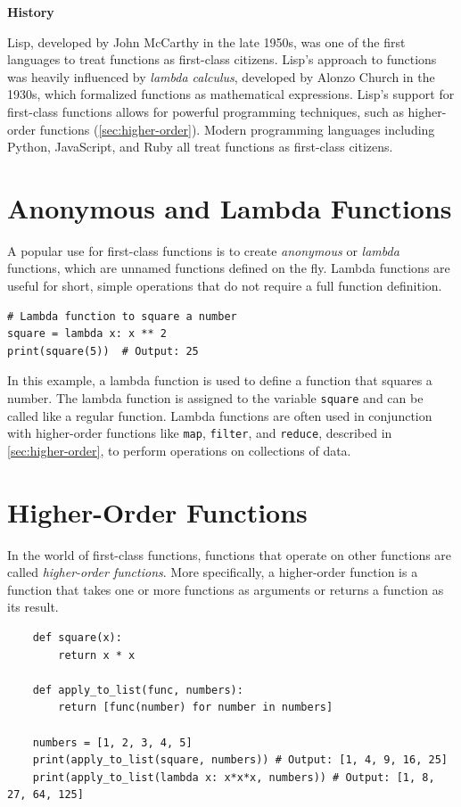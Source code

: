 \documentclass[oneside,11pt,dvipsnames]{book}
\newenvironment{historybox}[1][]{
  \small
  \begin{myhistorybox}
    {\small \textbf{#1}}
  }{
  \end{myhistorybox}
}
\newcommand{\code}[1]{\texttt{#1}}
\begin{document}
\begin{historybox}[History]
Lisp, developed by John McCarthy in the late 1950s, was one of the first languages to treat functions as first-class citizens. Lisp's approach to functions was heavily influenced by \emph{lambda calculus}, developed by Alonzo Church in the 1930s, which formalized functions as mathematical expressions. Lisp's support for first-class functions allows for powerful programming techniques, such as higher-order functions (\autoref{sec:higher-order}).  Modern programming languages including Python, JavaScript, and Ruby all treat functions as first-class citizens. 
\end{historybox}

\section{Anonymous and Lambda Functions}\label{sec:lambda}
A popular use for first-class functions is to create \emph{anonymous} or \emph{lambda} functions, which are unnamed functions defined on the fly. Lambda functions are useful for short, simple operations that do not require a full function definition. 
\begin{lstlisting}
# Lambda function to square a number
square = lambda x: x ** 2
print(square(5))  # Output: 25
\end{lstlisting}

In this example, a lambda function is used to define a function that squares a number. The lambda function is assigned to the variable \code{square} and can be called like a regular function.
Lambda functions are often used in conjunction with higher-order functions like \code{map}, \code{filter}, and \code{reduce}, described in \autoref{sec:higher-order}, to perform operations on collections of data.

\section{Higher-Order Functions}\label{sec:higher-order}

In the world of first-class functions, functions that operate on other functions are called \emph{higher-order functions}. More specifically, a higher-order function is a function that takes one or more functions as arguments or returns a function as its result.

\begin{lstlisting}
    def square(x):
        return x * x

    def apply_to_list(func, numbers):
        return [func(number) for number in numbers]

    numbers = [1, 2, 3, 4, 5]
    print(apply_to_list(square, numbers)) # Output: [1, 4, 9, 16, 25]
    print(apply_to_list(lambda x: x*x*x, numbers)) # Output: [1, 8, 27, 64, 125]

\end{lstlisting}
\end{document}

